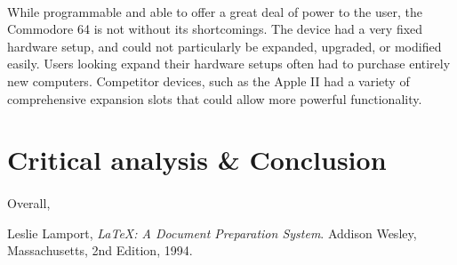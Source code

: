 \documentclass{article}
\begin{document}
\paragraph{}
While programmable and able to offer a great deal of power to the user, the Commodore 64 is not without its shortcomings. The device had a very fixed hardware setup, and could not particularly be expanded, upgraded, or modified easily. Users looking expand their hardware setups often had to purchase entirely new computers. Competitor devices, such as the Apple II had a variety of comprehensive expansion slots that could allow more powerful functionality. 

\section{Critical analysis \& Conclusion}
\paragraph{}
Overall,

\pagebreak

\begin{thebibliography}{9}

  Leslie Lamport,
  \emph{\LaTeX: A Document Preparation System}.
  Addison Wesley, Massachusetts,
  2nd Edition,
  1994.

\end{thebibliography}
\end{document}
